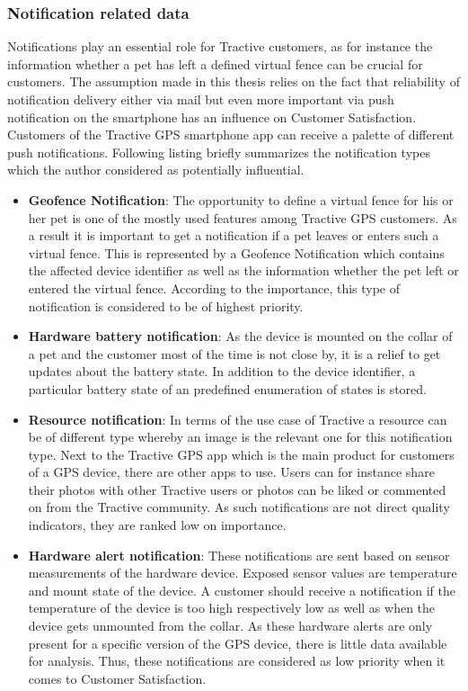 \subsubsection{Notification related data} 
Notifications play an essential role for Tractive customers, as for instance the information whether a pet has left a defined virtual fence can be crucial for customers. The assumption made in this thesis relies on the fact that reliability of notification delivery either via mail but even more important via push notification on the smartphone has an influence on Customer Satisfaction. Customers of the Tractive GPS smartphone app can receive a palette of different push notifications. Following listing briefly summarizes the notification types which the author considered as potentially influential.

\begin{itemize}
	\item \textbf{Geofence Notification}: The opportunity to define a virtual fence for his or her pet is one of the mostly used features among Tractive GPS customers. As a result it is important to get a notification if a pet leaves or enters such a virtual fence. This is represented by a Geofence Notification which contains the affected device identifier as well as the information whether the pet left or entered the virtual fence. According to the importance, this type of notification is considered to be of highest priority. 
	\item \textbf{Hardware battery notification}: As the device is mounted on the collar of a pet and the customer most of the time is not close by, it is a relief to get updates about the battery state. In addition to the device identifier, a particular battery state of an predefined enumeration of states is stored.
	\item \textbf{Resource notification}: In terms of the use case of Tractive a resource can be of different type whereby an image is the relevant one for this notification type. Next to the Tractive GPS app which is the main product for customers of a GPS device, there are other apps to use. Users can for instance share their photos with other Tractive users or photos can be liked or commented on from the Tractive community. As such notifications are not direct quality indicators, they are ranked low on importance.
	\item \textbf{Hardware alert notification}: These notifications are sent based on sensor measurements of the hardware device. Exposed sensor values are temperature and mount state of the device. A customer should receive a notification if the temperature of the device is too high respectively low as well as when the device gets unmounted from the collar. As these hardware alerts are only present for a specific version of the GPS device, there is little data available for analysis. Thus, these notifications are considered as low priority when it comes to Customer Satisfaction.
\end{itemize}

